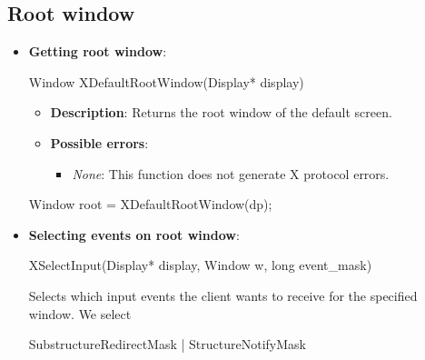 \documentclass{report}
\begin{document}
    \subsection{Root window}
    \begin{itemize}
        \item \textbf{Getting root window}: 
            \bigbreak \noindent 
            \begin{cppcode}
                Window XDefaultRootWindow(Display* display)
            \end{cppcode}
            \begin{itemize}
                \item \textbf{Description}: Returns the root window of the default screen.
                \item \textbf{Possible errors}:
                    \begin{itemize}
                        \item \textit{None}: This function does not generate X protocol errors.
                    \end{itemize}
            \end{itemize}
            \bigbreak \noindent 
            \begin{bashcode}
                Window root = XDefaultRootWindow(dp);
            \end{bashcode}
        \item \textbf{Selecting events on root window}:
            \bigbreak \noindent 
            \begin{cppcode}
                XSelectInput(Display* display, Window w, long event_mask)
            \end{cppcode}
            \bigbreak \noindent
            Selects which input events the client wants to receive for the specified window.
            \bigbreak \noindent 
            We select 
            \bigbreak \noindent 
            \begin{cppcode}
            SubstructureRedirectMask | StructureNotifyMask
            \end{cppcode}
    \end{itemize}

    \pagebreak 
\end{document}
